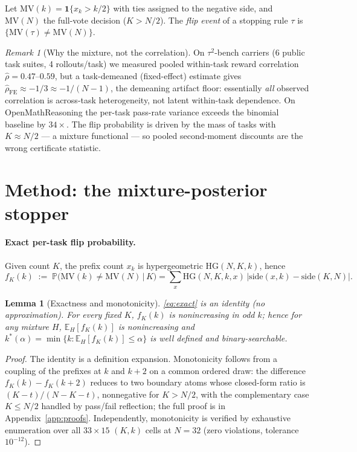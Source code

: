 \documentclass{article}
\newtheorem{lemma}{Lemma}
\theoremstyle{definition}
\theoremstyle{remark}
\newtheorem{remark}{Remark}
\newcommand{\HG}{\mathrm{HG}}
\newcommand{\MV}{\mathrm{MV}}
\newcommand{\E}{\mathbb{E}}
\renewcommand{\P}{\mathbb{P}}
\begin{document}
Let $\MV(k)=\mathbf{1}\{x_k>k/2\}$ with ties assigned to the negative side,
and $\MV(N)$ the full-vote decision ($K>N/2$). The \emph{flip event} of a
stopping rule $\tau$ is $\{\MV(\tau)\neq\MV(N)\}$.

\begin{remark}[Why the mixture, not the correlation]
\label{rem:pooled}
On $\tau^2$-bench carriers (6 public task suites, 4 rollouts/task) we measured
pooled within-task reward correlation $\hat\rho=0.47$--$0.59$, but a
task-demeaned (fixed-effect) estimate gives $\hat\rho_{\mathrm{FE}}\approx-1/3
\approx-1/(N-1)$, the demeaning artifact floor: essentially \emph{all}
observed correlation is across-task heterogeneity, not latent within-task
dependence. On OpenMathReasoning the per-task pass-rate variance exceeds the
binomial baseline by $34\times$. The flip probability is driven by the mass of
tasks with $K\approx N/2$ --- a mixture functional --- so pooled
second-moment discounts are the wrong certificate statistic.
\end{remark}

\section{Method: the mixture-posterior stopper}
\label{sec:method}

\paragraph{Exact per-task flip probability.}
Given count $K$, the prefix count $x_k$ is hypergeometric
$\HG(N,K,k)$, hence
\begin{equation}
f_K(k) \;:=\; \P\big(\MV(k)\neq\MV(N)\,\big|\,K\big)
= \sum_{x}\HG(N,K,k,x)\,\big|\mathrm{side}(x,k)-\mathrm{side}(K,N)\big|.
\label{eq:exact}
\end{equation}

\begin{lemma}[Exactness and monotonicity]
\label{lem:exact}
\eqref{eq:exact} is an identity (no approximation). For every fixed $K$,
$f_K(k)$ is nonincreasing in odd $k$; hence for any mixture $H$,
$\E_H[f_K(k)]$ is nonincreasing and
$k^*(\alpha)=\min\{k:\E_H[f_K(k)]\le\alpha\}$ is well defined and
binary-searchable.
\end{lemma}
\begin{proof}
The identity is a definition expansion. Monotonicity follows from a
coupling of the prefixes at $k$ and $k{+}2$ on a common ordered draw:
the difference $f_K(k)-f_K(k{+}2)$ reduces to two boundary atoms whose
closed-form ratio is $(K-t)/(N-K-t)$, nonnegative for $K>N/2$, with the
complementary case $K\le N/2$ handled by pass/fail reflection; the full
proof is in Appendix~\ref{app:proofs}. Independently, monotonicity is
verified by exhaustive enumeration over all $33\times15$ $(K,k)$ cells
at $N=32$ (zero violations, tolerance $10^{-12}$).
\end{proof}
\end{document}
